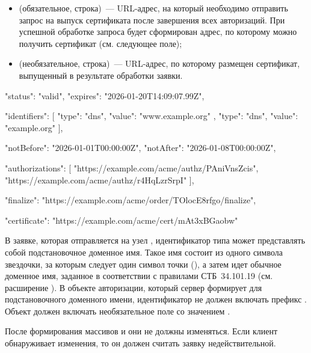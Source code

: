 \begin{itemize}
\begin{note*}
Перечень объектов авторизации определяется политикой сервера. Между 
идентификаторами и объектами может не быть соотношения 1:1;
\end{note*}

\item
{} (обязательное, строка)~--- URL-адрес, на который необходимо 
отправить запрос на выпуск сертификата после завершения всех авторизаций.
%
При успешной обработке запроса будет сформирован адрес, по которому можно 
получить сертификат (см. следующее поле);

\item
{} (необязательное, строка)~--- URL-адрес, по которому 
размещен сертификат, выпущенный в результате обработки заявки. 
\end{itemize}

\begin{codeblock}
{
  "status": "valid",
  "expires": "2026-01-20T14:09:07.99Z",

  "identifiers": [
    { "type": "dns", "value": "www.example.org" },
    { "type": "dns", "value": "example.org" }
  ],

  "notBefore": "2026-01-01T00:00:00Z",
  "notAfter": "2026-01-08T00:00:00Z",

  "authorizations": [
    "https://example.com/acme/authz/PAniVnsZcis",
    "https://example.com/acme/authz/r4HqLzrSrpI"
  ],

  "finalize": "https://example.com/acme/order/TOlocE8rfgo/finalize",

  "certificate": "https://example.com/acme/cert/mAt3xBGaobw"
}
\end{codeblock}
\fi
 
В заявке, которая отправляется на узел , идентификатор 
типа  может представлять собой подстановочное доменное имя. 
%
Такое имя состоит из одного символа звездочки, за которым следует один символ
точки (), а затем идет обычное доменное имя,  заданное в соответствии с
правилами СТБ~34.101.19 (см. расширение ).
%
В объекте авторизации, который сервер формирует для подстановочного доменного имени, 
идентификатор не должен включать префикс . Объект должен включать 
необязательное поле  со значением . 

После формирования массивов  и  
они не должны изменяться. Если клиент обнаруживает изменения, то он 
должен считать заявку недействительной.  

